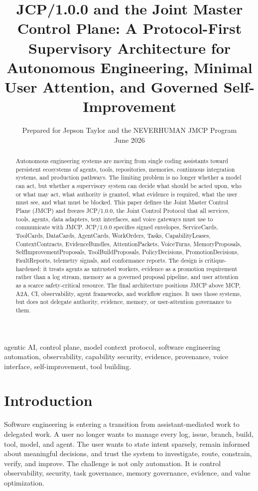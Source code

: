 \documentclass[12pt,journal,onecolumn,draftclsnofoot]{IEEEtran}
\title{JCP/1.0.0 and the Joint Master Control Plane: A Protocol-First Supervisory Architecture for Autonomous Engineering, Minimal User Attention, and Governed Self-Improvement}
\author{Prepared for Jepson Taylor and the NEVERHUMAN JMCP Program\\June 2026}
\begin{document}
\maketitle

\begin{abstract}
Autonomous engineering systems are moving from single coding assistants toward persistent ecosystems of agents, tools, repositories, memories, continuous integration systems, and production pathways. The limiting problem is no longer whether a model can act, but whether a supervisory system can decide what should be acted upon, who or what may act, what authority is granted, what evidence is required, what the user must see, and what must be blocked. This paper defines the Joint Master Control Plane (JMCP) and freezes JCP/1.0.0, the Joint Control Protocol that all services, tools, agents, data adapters, text interfaces, and voice gateways must use to communicate with JMCP. JCP/1.0.0 specifies signed envelopes, ServiceCards, ToolCards, DataCards, AgentCards, WorkOrders, Tasks, CapabilityLeases, ContextContracts, EvidenceBundles, AttentionPackets, VoiceTurns, MemoryProposals, SelfImprovementProposals, ToolBuildProposals, PolicyDecisions, PromotionDecisions, FaultReports, telemetry signals, and conformance reports. The design is critique-hardened: it treats agents as untrusted workers, evidence as a promotion requirement rather than a log stream, memory as a governed proposal pipeline, and user attention as a scarce safety-critical resource. The final architecture positions JMCP above MCP, A2A, CI, observability, agent frameworks, and workflow engines. It uses those systems, but does not delegate authority, evidence, memory, or user-attention governance to them.
\end{abstract}

\begin{IEEEkeywords}
agentic AI, control plane, model context protocol, software engineering automation, observability, capability security, evidence, provenance, voice interface, self-improvement, tool building.
\end{IEEEkeywords}

\section{Introduction}
Software engineering is entering a transition from assistant-mediated work to delegated work. A user no longer wants to manage every log, issue, branch, build, tool, model, and agent. The user wants to state intent sparsely, remain informed about meaningful decisions, and trust the system to investigate, route, constrain, verify, and improve. The challenge is not only automation. It is control observability, security, task governance, memory governance, evidence, and value optimization.
\end{document}
